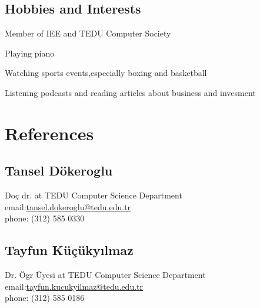 \documentclass[]{deedy-resume-openfont}
\begin{document}
\begin{minipage}[t]{0.66\textwidth}






\subsection{Hobbies and Interests} 
\begin{tightemize}
\sectionsep
\item Member of IEE and TEDU Computer Society\item Playing  piano\item Watching sports events,especially boxing and basketball\item Listening podcasts and reading articles about business and invesment
\end{tightemize}
	\section {References}
\subsection{Tansel Dökeroglu} 
Doç dr. at TEDU Computer Science Department \\[0.09in]
email:\href{tansel.dokeroglu@tedu.edu.tr}{tansel.dokeroglu@tedu.edu.tr}\\[0.1in]
phone: (312) 585 0330
\subsection{Tayfun Küçükyılmaz}
Dr. Ögr Üyesi at TEDU Computer Science Department\\[0.1in]
email:\href{tayfun.kucukyilmaz@tedu.edu.tr}{tayfun.kucukyilmaz@tedu.edu.tr}\\[0.1in]
phone: (312) 585 0186


 \end{minipage}
\end{document}
